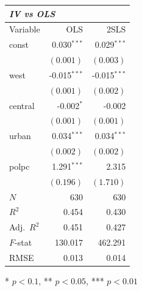 \renewcommand{\arraystretch}{1.1}
\setlength{\tabcolsep}{6pt}
\begin{table}[H]
\centering
\begin{tabular}{lrr}
\hline
\multicolumn{3}{l}{\textit{IV vs OLS}} \\
\hline
Variable & OLS & 2SLS \\
\hline
const & 0.030$^{\ast\ast\ast}$ & 0.029$^{\ast\ast\ast}$ \\
 & $(0.001)$ & $(0.003)$ \\
west & -0.015$^{\ast\ast\ast}$ & -0.015$^{\ast\ast\ast}$ \\
 & $(0.001)$ & $(0.002)$ \\
central & -0.002$^{\ast}$ & -0.002 \\
 & $(0.001)$ & $(0.001)$ \\
urban & 0.034$^{\ast\ast\ast}$ & 0.034$^{\ast\ast\ast}$ \\
 & $(0.002)$ & $(0.002)$ \\
polpc & 1.291$^{\ast\ast\ast}$ & 2.315 \\
 & $(0.196)$ & $(1.710)$ \\
\hline
$N$ & 630 & 630 \\
$R^2$ & 0.454 & 0.430 \\
Adj.\ $R^2$ & 0.451 & 0.427 \\
$F$-stat & 130.017 & 462.291 \\
RMSE & 0.013 & 0.014 \\
\hline
\end{tabular}
\end{table}
\vspace{2pt}
\begin{flushleft}\footnotesize{* $p<0.1$, ** $p<0.05$, *** $p<0.01$}\end{flushleft}